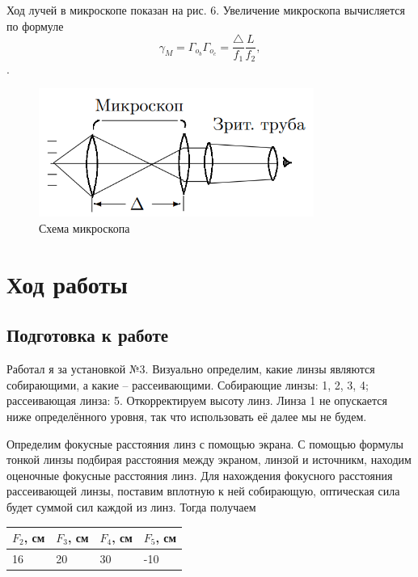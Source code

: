 \documentclass[a4paper,12pt]{article}
\theoremstyle{definition}
\begin{document}
Ход лучей в микроскопе показан на рис. 6. Увеличение микроскопа вычисляется по формуле
    \begin{equation}
        \gamma_M = \Gamma_{o_b} \Gamma_{o_c} = \frac{\triangle}{f_1} \frac{L}{f_2},
    \end{equation}.

    \begin{figure}[h]
    \centering
    \includegraphics[width=9cm]{micro_2.PNG}
    \caption{Схема микроскопа}
    \label{fig:vac}
\end{figure}


\newpage
\section{Ход работы}
\subsection{Подготовка к работе}
\par Работал я за установкой №3. Визуально определим, какие линзы являются собирающими, а какие -- рассеивающими. Собирающие линзы: 1, 2, 3, 4; рассеивающая линза: 5. Откорректируем высоту линз. Линза 1 не опускается ниже определённого уровня, так что использовать её далее мы не будем.
\par Определим фокусные расстояния линз с помощью экрана. С помощью формулы тонкой линзы подбирая расстояния между экраном, линзой и источникм, находим оценочные фокусные расстояния линз. Для нахождения фокусного расстояния рассеивающей линзы, поставим вплотную к ней собирающую, оптическая сила будет суммой сил каждой из линз. Тогда получаем

\begin{table}[h!]
\centering
\begin{tabular}{|l|l|l|l|}
\hline
$F_2$, см  & $F_3$, см & $F_4$, см  & $F_5$, см  \\ \hline
16 & 20 & 30 & -10 \\ \hline
\end{tabular}
\end{table}
\end{document}
